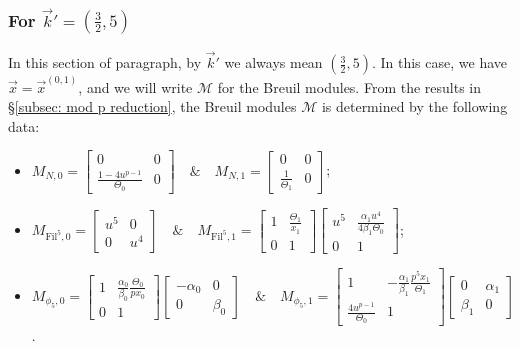 \documentclass[11pt]{amsart}
\theoremstyle{definition}
\numberwithin{equation}{subsection}
\theoremstyle{plain}
\theoremstyle{plain}
\theoremstyle{plain}
\theoremstyle{plain}
\theoremstyle{plain}
\theoremstyle{plain}
\theoremstyle{plain}
\theoremstyle{plain}
\theoremstyle{plain}
\theoremstyle{plain}
\theoremstyle{plain}
\theoremstyle{plain}
\theoremstyle{definition}
\theoremstyle{definition}
\theoremstyle{definition}
\theoremstyle{remark}
\renewcommand{\(}{\textup{(}}
\renewcommand{\)}{\textup{)}}
\newcommand{\cM}{\mathcal{M}}
\newcommand{\Fil}{\mathrm{Fil}}
\newcommand{\vx}{\vec{x}}
\newcommand{\vk}{\vec{k}}
\begin{document}
\subsubsection{\textbf{For $\vk'=(\frac{3}{2},5)$}}\label{subsubsec: vr=(1,5), vk=(3/2,5)}
In this section of paragraph, by $\vk'$ we always mean $(\frac{3}{2},5)$. In this case, we have $\vx=\vx^{(0,1)}$, and we will write $\cM$ for the Breuil modules. From the results in \S\ref{subsec: mod p reduction}, the Breuil modules $\cM$ is determined by the following data:
\begin{itemize}[leftmargin=*]
  \item $M_{N,0}=
  \begin{bmatrix}
    0 & 0 \\
    \frac{1-4u^{p-1}}{\Theta_0} & 0
  \end{bmatrix}\quad\&\quad
  M_{N,1}=
  \begin{bmatrix}
    0 & 0 \\
    \frac{1}{\Theta_1} & 0
  \end{bmatrix}$;
  \item $M_{\Fil^5,0}=
  \begin{bmatrix}
    u^5 & 0 \\
    0 & u^4
  \end{bmatrix}\quad\&\quad
  M_{\Fil^5,1}=
  \begin{bmatrix}
    1 & \frac{\Theta_1}{x_1} \\
    0 & 1
  \end{bmatrix}
  \begin{bmatrix}
    u^5 & \frac{\alpha_1u^4}{4\beta_1\Theta_0} \\
    0 & 1
  \end{bmatrix}$;
  \item $M_{\phi_5,0}=
  \begin{bmatrix}
    1 & \frac{\alpha_0}{\beta_0}\frac{\Theta_0}{px_0}\\
    0 & 1
  \end{bmatrix}
  \begin{bmatrix}
    -\alpha_0 & 0\\
    0 & \beta_0
  \end{bmatrix}\quad\&\quad
  M_{\phi_5,1}=
  \begin{bmatrix}
    1 & -\frac{\alpha_1}{\beta_1}\frac{p^5x_1}{\Theta_1} \\
    \frac{4u^{p-1}}{\Theta_0} & 1
  \end{bmatrix}
  \begin{bmatrix}
    0 & \alpha_1 \\
    \beta_1 & 0
  \end{bmatrix}$.
\end{itemize}
\end{document}
